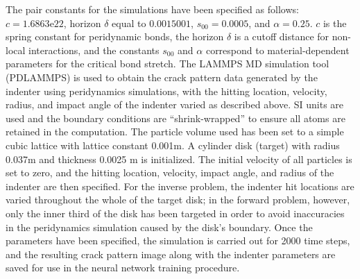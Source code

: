 The pair constants for the simulations have been specified as follows: $c=1.6863\mathrm{e}22$, horizon $\delta$ equal to $0.0015001$, $s_{00}= 0.0005$, and $\alpha = 0.25$.
$c$ is the spring constant for peridynamic bonds, the horizon $\delta$ is a cutoff distance for non-local interactions,
and the constants $s_{00}$ and $\alpha$ correspond to material-dependent parameters for the critical bond stretch.
The LAMMPS MD simulation tool (PDLAMMPS) \cite{Ref17,Ref18} is used to obtain the crack pattern data generated by the indenter using peridynamics simulations,
with the hitting location, velocity, radius, and impact angle of the indenter varied as described above.
SI units are used and the boundary conditions are ``shrink-wrapped'' to ensure all atoms are retained in the computation.
The particle volume used has been set to a simple cubic lattice with lattice constant 0.001m.
A cylinder disk (target) with radius 0.037m and thickness 0.0025 m is initialized.
The initial velocity of all particles is set to zero, and the hitting location, velocity, impact angle, and radius of the indenter are then specified.
For the inverse problem, the indenter hit locations are varied throughout the whole of the target disk;
in the forward problem, however, only the inner third of the disk has been targeted in order to avoid inaccuracies in the peridynamics simulation caused by the disk's boundary.
Once the parameters have been specified, the simulation is carried out for 2000 time steps, and the resulting crack pattern image along with the indenter parameters are saved for use in the neural network training procedure.

